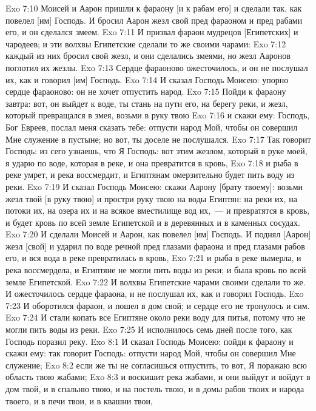 \vs Exo 7:10 Моисей и Аарон пришли к фараону [и к рабам его] и сделали так, как повелел [им] Господь. И бросил Аарон жезл свой пред фараоном и пред рабами его, и он сделался змеем.
\vs Exo 7:11 И призвал фараон мудрецов [Египетских] и чародеев; и эти волхвы Египетские сделали то же своими чарами:
\vs Exo 7:12 каждый из них бросил свой жезл, и они сделались змеями, но жезл Ааронов поглотил их жезлы.
\vs Exo 7:13 Сердце фараоново ожесточилось, и он не послушал их, как и говорил [им] Господь.
\rsbpar\vs Exo 7:14 И сказал Господь Моисею: упорно сердце фараоново: он не хочет отпустить народ.
\vs Exo 7:15 Пойди к фараону завтра: вот, он выйдет к воде, ты стань на пути его, на берегу реки, и жезл, который превращался в змея, возьми в руку твою
\vs Exo 7:16 и скажи ему: Господь, Бог Евреев, послал меня сказать тебе: отпусти народ Мой, чтобы он совершил Мне служение в пустыне; но вот, ты доселе не послушался.
\vs Exo 7:17 Так говорит Господь: из сего узнаешь, что Я Господь: вот этим жезлом, который в руке моей, я ударю по воде, которая в реке, и она превратится в кровь,
\vs Exo 7:18 и рыба в реке умрет, и река воссмердит, и Египтянам омерзительно будет пить воду из реки.
\vs Exo 7:19 И сказал Господь Моисею: скажи Аарону [брату твоему]: возьми жезл твой [в руку твою] и простри руку твою на воды Египтян: на реки их, на потоки их, на озера их и на всякое вместилище вод их,~--- и превратятся в кровь, и будет кровь по всей земле Египетской и в деревянных и в каменных сосудах.
\vs Exo 7:20 И сделали Моисей и Аарон, как повелел [им] Господь. И поднял [Аарон] жезл [свой] и ударил по воде речной пред глазами фараона и пред глазами рабов его, и вся вода в реке превратилась в кровь,
\vs Exo 7:21 и рыба в реке вымерла, и река воссмердела, и Египтяне не могли пить воды из реки; и была кровь по всей земле Египетской.
\vs Exo 7:22 И волхвы Египетские чарами своими сделали то же. И ожесточилось сердце фараона, и не послушал их, как и говорил Господь.
\vs Exo 7:23 И оборотился фараон, и пошел в дом свой; и сердце его не тронулось и сим.
\vs Exo 7:24 И стали копать все Египтяне около реки  воду для питья, потому что не могли пить воды из реки.
\vs Exo 7:25 И исполнилось семь дней после того, как Господь поразил реку.
\vs Exo 8:1 И сказал Господь Моисею: пойди к фараону и скажи ему: так говорит Господь: отпусти народ Мой, чтобы он совершил Мне служение;
\vs Exo 8:2 если же ты не согласишься отпустить, то вот, Я поражаю всю область твою жабами;
\vs Exo 8:3 и воскишит река жабами, и они выйдут и войдут в дом твой, и в спальню твою, и на постель твою, и в домы рабов твоих и народа твоего, и в печи твои, и в квашни твои,
